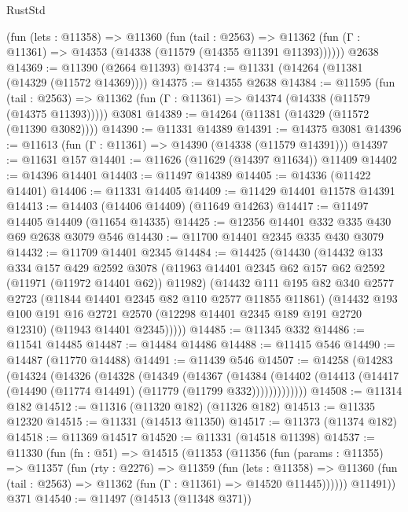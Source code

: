 \begin{lexlean}{RustStd}
\begin{coremodule}
    (fun (lets : @11358) =>
    @11360
      (fun (tail : @2563) =>
      @11362 (fun (Γ : @11361) => @14353 (@14338 (@11579 (@14355 @11391 @11393))))))
    @2638
@14369 := @11390 (@2664 @11393)
@14374 := @11331 (@14264 (@11381 (@14329 (@11572 @14369))))
@14375 := @14355 @2638
@14384 := @11595
    (fun (tail : @2563) => @11362 (fun (Γ : @11361) => @14374 (@14338 (@11579 (@14375 @11393)))))
    @3081
@14389 := @14264 (@11381 (@14329 (@11572 (@11390 @3082))))
@14390 := @11331 @14389
@14391 := @14375 @3081
@14396 := @11613 (fun (Γ : @11361) => @14390 (@14338 (@11579 @14391)))
@14397 := @11631 @157
@14401 := @11626 (@11629 (@14397 @11634)) @11409
@14402 := @14396 @14401
@14403 := @11497 @14389
@14405 := @14336 (@11422 @14401)
@14406 := @11331 @14405
@14409 := @11429 @14401 @11578 @14391
@14413 := @14403 (@14406 @14409) (@11649 @14263)
@14417 := @11497 @14405 @14409 (@11654 @14335)
@14425 := @12356 @14401 @332 @335 @430 @69 @2638 @3079 @546
@14430 := @11700 @14401 @2345 @335 @430 @3079
@14432 := @11709 @14401 @2345
@14484 := @14425
    (@14430
      (@14432
        @133
        @334
        @157
        @429
        @2592
        @3078
        (@11963 @14401 @2345 @62 @157 @62 @2592 (@11971 (@11972 @14401 @62)) @11982)
        (@14432
          @111
          @195
          @82
          @340
          @2577
          @2723
          (@11844 @14401 @2345 @82 @110 @2577 @11855 @11861)
          (@14432
            @193
            @100
            @191
            @16
            @2721
            @2570
            (@12298 @14401 @2345 @189 @191 @2720 @12310)
            (@11943 @14401 @2345)))))
@14485 := @11345 @332
@14486 := @11541 @14485
@14487 := @14484 @14486
@14488 := @11415 @546
@14490 := @14487 (@11770 @14488)
@14491 := @11439 @546
@14507 := @14258
    (@14283
      (@14324
        (@14326
          (@14328
            (@14349
              (@14367
                (@14384
                  (@14402 (@14413 (@14417 (@14490 (@11774 @14491) (@11779 (@11799 @332)))))))))))))
@14508 := @11314 @182
@14512 := @11316 (@11320 @182) (@11326 @182)
@14513 := @11335 @12320
@14515 := @11331 (@14513 @11350)
@14517 := @11373 (@11374 @182)
@14518 := @11369 @14517
@14520 := @11331 (@14518 @11398)
@14537 := @11330
    (fun (fn : @51) =>
    @14515
      (@11353
        (@11356
          (fun (params : @11355) =>
          @11357
            (fun (rty : @2276) =>
            @11359
              (fun (lets : @11358) =>
              @11360 (fun (tail : @2563) => @11362 (fun (Γ : @11361) => @14520 @11445))))))
        @11491))
    @371
@14540 := @11497 (@14513 (@11348 @371))

\end{coremodule}
\end{lexlean}
